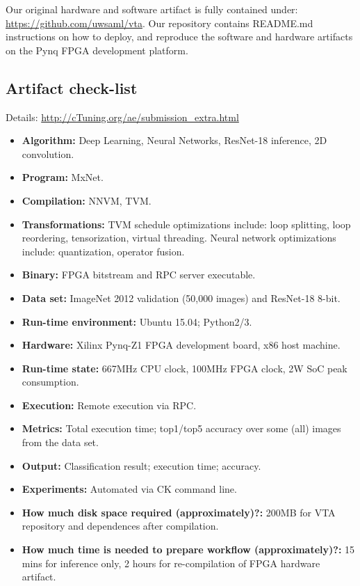 \documentclass[sigconf]{acmart}
\begin{document}
Our original hardware and software artifact is fully contained under: \url{https://github.com/uwsaml/vta}.
Our repository contains README.md instructions on how to deploy, and reproduce the software and hardware artifacts on the Pynq FPGA development platform.

\subsection{Artifact check-list}

Details: \url{http://cTuning.org/ae/submission_extra.html}

\begin{itemize}
  \item {\bf Algorithm:} Deep Learning, Neural Networks, ResNet-18 inference, 2D convolution.
  \item {\bf Program:} MxNet.
  \item {\bf Compilation:} NNVM, TVM.
  \item {\bf Transformations:} TVM schedule optimizations include: loop splitting, loop reordering, tensorization, virtual threading. Neural network optimizations include: quantization, operator fusion.
  \item {\bf Binary:} FPGA bitstream and RPC server executable.
  \item {\bf Data set:} ImageNet 2012 validation (50,000 images) and ResNet-18 8-bit.
  \item {\bf Run-time environment:} Ubuntu 15.04; Python2/3.
  \item {\bf Hardware:} Xilinx Pynq-Z1 FPGA development board, x86 host machine.
  \item {\bf Run-time state:} 667MHz CPU clock, 100MHz FPGA clock, 2W SoC peak consumption.
  \item {\bf Execution:} Remote execution via RPC.
  \item {\bf Metrics:} Total execution time; top1/top5 accuracy over some (all) images from the data set.
  \item {\bf Output:} Classification result; execution time; accuracy.
  \item {\bf Experiments:} Automated via CK command line.
  \item {\bf How much disk space required (approximately)?:} 200MB for VTA repository and dependences after compilation.
  \item {\bf How much time is needed to prepare workflow (approximately)?:} 15 mins for inference only, 2 hours for re-compilation of FPGA hardware artifact.

\end{itemize}
\end{document}
